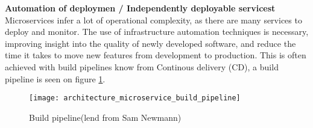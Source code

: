 \textbf{Automation of deploymen / Independently deployable servicest}\\
Microservices infer a lot of operational complexity, as there are many services to deploy and monitor. The use of infrastructure automation techniques is necessary, improving insight into the quality of newly developed software, and reduce the time it takes to move new features from development to production\cite{newman2015microservices}. This is often achieved with build pipelines know from Continous delivery (CD), a build pipeline is seen on figure \ref{fig:architecture_microservice_build_pipeline}.

\begin{figure}[!htb]
  \texttt{[image: architecture\_microservice\_build\_pipeline]}  
  \caption{Build pipeline(lend from Sam Newmann)}
  \label{fig:architecture_microservice_build_pipeline}
\end{figure}

